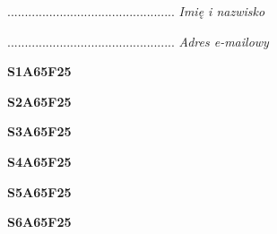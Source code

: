 \begin{turn}{90}\begin{minipage}{\linewidth} \vspace{20mm} ................................................  \textit{Imię i nazwisko}\end{minipage}\end{turn}

\begin{turn}{90}\begin{minipage}{\linewidth} \vspace{20mm} ................................................  \textit{Adres e-mailowy}\end{minipage}\end{turn}

\begin{turn}{90}\huge \begin{minipage}{\linewidth} \vspace{10mm}\textbf{S1A65F25}\end{minipage}\end{turn}

\begin{turn}{90}\huge \begin{minipage}{\linewidth} \vspace{10mm}\textbf{S2A65F25}\end{minipage}\end{turn}

\begin{turn}{90}\huge \begin{minipage}{\linewidth} \vspace{10mm}\textbf{S3A65F25}\end{minipage}\end{turn}

\begin{turn}{90}\huge \begin{minipage}{\linewidth} \vspace{10mm}\textbf{S4A65F25}\end{minipage}\end{turn}

\begin{turn}{90}\huge \begin{minipage}{\linewidth} \vspace{10mm}\textbf{S5A65F25}\end{minipage}\end{turn}

\begin{turn}{90}\huge \begin{minipage}{\linewidth} \vspace{10mm}\textbf{S6A65F25}\end{minipage}\end{turn}

